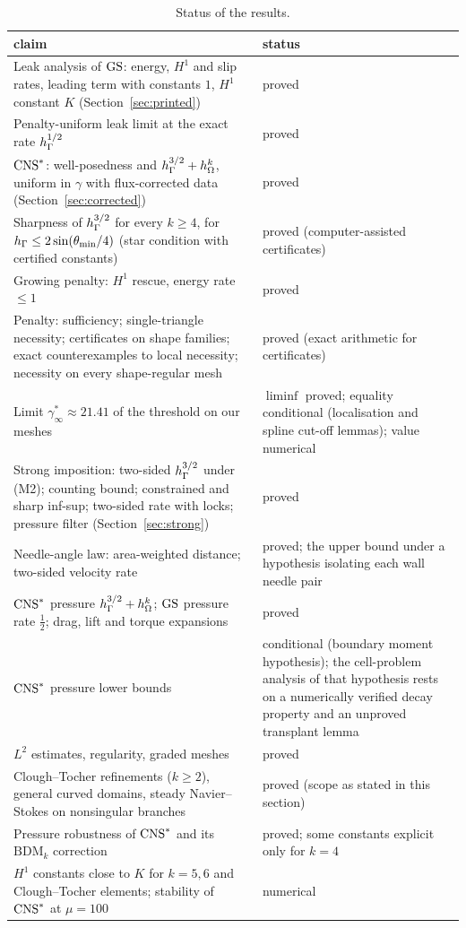 \begin{table}[t]
\centering\small
\caption{Status of the results.}\label{tab:status}
\begin{tabular}{p{}p{}}
\toprule
claim & status\\
\midrule
Leak analysis of $\mathrm{GS}$: energy, $H^1$ and slip rates, leading term with constants $1$, $H^1$ constant $K$ (Section~\ref{sec:printed}) & proved\\
Penalty-uniform leak limit at the exact rate $h_\Gamma^{1/2}$ & proved\\
$\mathrm{CNS}^\ast$: well-posedness and $h_\Gamma^{3/2}+h_\Omega^k$, uniform in $\gamma$ with flux-corrected data (Section~\ref{sec:corrected}) & proved\\
Sharpness of $h_\Gamma^{3/2}$ for every $k\ge4$, for $h_\Gamma\le2\sin(\theta_{\min}/4)$ (star condition with certified constants) & proved (computer-assisted certificates)\\
Growing penalty: $H^1$ rescue, energy rate $\le1$ & proved\\
Penalty: sufficiency; single-triangle necessity; certificates on shape families; exact counterexamples to local necessity; necessity on every shape-regular mesh & proved (exact arithmetic for certificates)\\
Limit $\gamma^\ast_\infty\approx21.41$ of the threshold on our meshes & $\liminf$ proved; equality conditional (localisation and spline cut-off lemmas); value numerical\\
Strong imposition: two-sided $h_\Gamma^{3/2}$ under (M2); counting bound; constrained and sharp inf-sup; two-sided rate with locks; pressure filter (Section~\ref{sec:strong}) & proved\\
Needle-angle law: area-weighted distance; two-sided velocity rate & proved; the upper bound under a hypothesis isolating each wall needle pair\\
$\mathrm{CNS}^\ast$ pressure $h_\Gamma^{3/2}+h_\Omega^k$; $\mathrm{GS}$ pressure rate $\frac12$; drag, lift and torque expansions & proved\\
$\mathrm{CNS}^\ast$ pressure lower bounds & conditional (boundary moment hypothesis); the cell-problem analysis of that hypothesis rests on a numerically verified decay property and an unproved transplant lemma\\
$L^2$ estimates, regularity, graded meshes & proved\\
Clough--Tocher refinements ($k\ge2$), general curved domains, steady Navier--Stokes on nonsingular branches & proved (scope as stated in this section)\\
Pressure robustness of $\mathrm{CNS}^\ast$ and its $\mathrm{BDM}_k$ correction & proved; some constants explicit only for $k=4$\\
$H^1$ constants close to $K$ for $k=5,6$ and Clough--Tocher elements; stability of $\mathrm{CNS}^\ast$ at $\mu=100$ & numerical\\
\bottomrule
\end{tabular}
\end{table}
